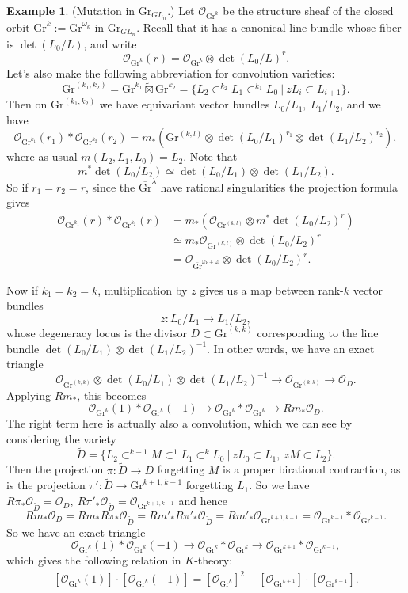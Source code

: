 \documentclass[11pt]{amsart}
\theoremstyle{definition}
\newtheorem{example}[dummy]{Example}
\newcommand{\Gr}{\mathrm{Gr}}
\newcommand{\Oc}{\mathcal{O}}
\numberwithin{equation}{subsection}
\numberwithin{figure}{subsection}
\begin{document}
\begin{example}{(Mutation in $\Gr_{GL_n}$.)}
Let $\Oc_{\Gr^k}$ be the structure sheaf of the closed orbit $\Gr^k:=\Gr^{\omega_k}$ in $\Gr_{GL_n}$. Recall that it has a canonical line bundle whose fiber is $\det(L_0/L)$, and write
$$
\Oc_{\Gr^k}(r) = \Oc_{\Gr^k}\otimes\det(L_0/L)^r.
$$
Let's also make the following abbreviation for convolution varieties:
$$
\Gr^{(k_1,k_2)} = \Gr^{k_1}\widetilde{\boxtimes}\Gr^{k_2}=\{L_2\subset^{k_2}L_1\subset^{k_1} L_0~|~ zL_i\subset L_{i+1}\}.
$$
Then on $\Gr^{(k_1,k_2)}$ we have equivariant vector bundles $L_0/L_1,~L_1/L_2$, and we have
$$
\Oc_{\Gr^{k_1}}(r_1) * \Oc_{\Gr^{k_2}}(r_2) = m_*(\Gr^{(k,l)}\otimes \det(L_0/L_1)^{r_1}\otimes\det(L_1/L_2)^{r_2}),
$$
where as usual $m(L_2,L_1,L_0)=L_2$. Note that 
$$
m^*\det(L_0/L_2)\simeq \det(L_0/L_1)\otimes\det(L_1/L_2).
$$
So if $r_1=r_2=r$, since the $\overline{\Gr}^\lambda$ have rational singularities the projection formula gives
\begin{align*}
\Oc_{\Gr^{k_1}}(r) * \Oc_{\Gr^{k_2}}(r)&=m_*(\Oc_{\Gr^{(k,l)}}\otimes m^*\det(L_0/L_2)^r)\\
&\simeq m_*\Oc_{\Gr^{(k,l)}}\otimes \det(L_0/L_2)^r\\
&=\Oc_{\overline{\Gr}^{\omega_k+\omega_l}}\otimes \det(L_0/L_2)^r.
\end{align*}



Now if $k_1=k_2=k$, multiplication by $z$ gives us a map between rank-$k$ vector bundles 
$$
z\colon L_0/L_1\longrightarrow L_1/L_2,
$$
whose degeneracy locus is the divisor $D\subset \Gr^{(k,k)}$ corresponding to the line bundle $\det(L_0/L_1)\otimes\det(L_1/L_2)^{-1}$. In other words, we have an exact triangle
$$
\mathcal{O}_{\Gr^{(k,k)}}\otimes\det(L_0/L_1)\otimes\det(L_1/L_2)^{-1}\longrightarrow \mathcal{O}_{\Gr^{(k,k)}}\longrightarrow \mathcal{O}_D.
$$
Applying $Rm_*$, this becomes
$$
\Oc_{\Gr^k}(1)*\Oc_{\Gr^k}(-1)\longrightarrow \Oc_{\Gr^k}*\Oc_{\Gr^k}\rightarrow Rm_*\Oc_D.
$$
The right term here is actually also a convolution, which we can see by
considering the variety
$$
\widetilde{D} = \{L_2\subset^{k-1}M\subset^1 L_1 \subset^{k}L_0~\big|~zL_0\subset L_1, ~zM\subset L_2\}.
$$
Then the projection $\pi:\widetilde{D}\rightarrow D$ forgetting $M$ is a proper birational contraction, as is the projection $\pi':\widetilde D\rightarrow \Gr^{k+1,k-1}$ forgetting $L_1$. So we have $R\pi_*\Oc_{\widetilde D}=\Oc_D,~R\pi'_*\Oc_{\widetilde D}=\Oc_{\Gr^{k+1,k-1}}$ and hence
$$
Rm_*\Oc_D = Rm_*R\pi_* \Oc_{\widetilde D} = Rm'_*R\pi'_* \Oc_{\widetilde D}=Rm'_*\Oc_{\Gr^{k+1,k-1}}=\Oc_{\Gr^{k+1}}*\Oc_{\Gr^{k-1}}.
$$
So we have an exact triangle
$$
\Oc_{\Gr^k}(1)*\Oc_{\Gr^k}(-1)\longrightarrow \Oc_{\Gr^k}*\Oc_{\Gr^k}\rightarrow \Oc_{\Gr^{k+1}}*\Oc_{\Gr^{k-1}},
$$
which gives the following relation in $K$-theory:
\begin{align}
\label{eq:gr-mut}
[\Oc_{\Gr^k}(1)]\cdot[\Oc_{\Gr^k}(-1)] = [\Oc_{\Gr^k}]^2 - [\Oc_{\Gr^{k+1}}]\cdot[\Oc_{\Gr^{k-1}}].
\end{align}
\end{example}
\end{document}
